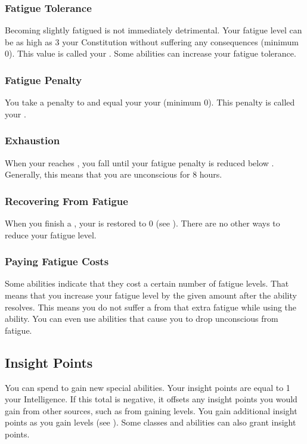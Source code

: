     \subsubsection{Fatigue Tolerance}\label{Fatigue Tolerance}
      Becoming slightly fatigued is not immediately detrimental.
      Your fatigue level can be as high as 3 \add your Constitution without suffering any consequences (minimum 0).
      This value is called your .
      Some abilities can increase your fatigue tolerance.

    \subsubsection{Fatigue Penalty}\label{Fatigue Penalty}
      You take a penalty to  and  equal your  \sub your  (minimum 0).
      This penalty is called your .

    \subsubsection{Exhaustion}\label{Exhaustion}
      When your  reaches , you fall \unconscious until your fatigue penalty is reduced below .
      Generally, this means that you are unconscious for 8 hours.

    \subsubsection{Recovering From Fatigue}
      When you finish a , your  is restored to 0 (see ).
      There are no other ways to reduce your fatigue level.

    \subsubsection{Paying Fatigue Costs}
      Some abilities indicate that they cost a certain number of fatigue levels.
      That means that you increase your fatigue level by the given amount after the ability resolves.
      This means you do not suffer a  from that extra fatigue while using the ability.
      You can even use abilities that cause you to drop unconscious from fatigue.

  \subsection{Insight Points}\label{Insight Points}
    You can spend  to gain new special abilities.
    Your insight points are equal to 1 \add your Intelligence.
    If this total is negative, it offsets any insight points you would gain from other sources, such as from gaining levels.
    You gain additional insight points as you gain levels (see ).
    Some classes and abilities can also grant insight points.

